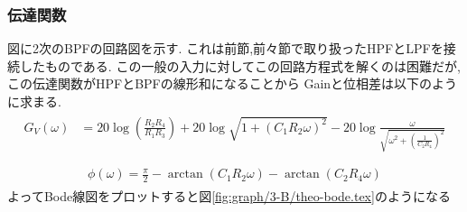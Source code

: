\subsubsection{伝達関数}
図に2次のBPFの回路図を示す.
これは前節,前々節で取り扱ったHPFとLPFを接続したものである.
この一般の入力に対してこの回路方程式を解くのは困難だが,この伝達関数がHPFとBPFの線形和になることから
Gainと位相差は以下のように求まる.
\begin{align}
  \begin{split}
    G_V(\omega)&=20\log\left(\frac{R_2R_4}{R_1R_3}\right)+20\log\sqrt{1+(C_1R_2\omega)^2}-20\log\frac{\omega}{\sqrt{\omega^2+\left(\frac{1}{C_2R_4}\right)^2}}\\
  \end{split}
\end{align}
\begin{align}
  \begin{split}
    \phi(\omega)=\frac{\pi}{2}-\arctan(C_1R_2\omega)-\arctan(C_2R_4\omega)
  \end{split}
\end{align}
よってBode線図をプロットすると図\ref{fig:graph/3-B/theo-bode.tex}のようになる

